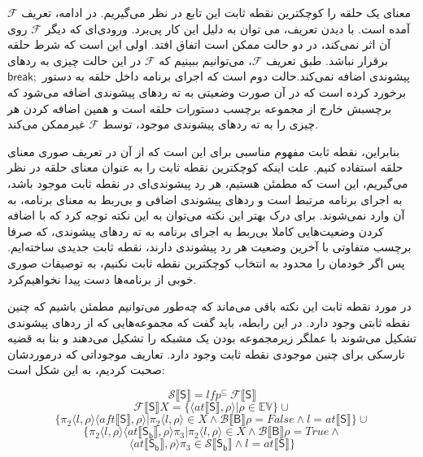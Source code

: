 \begin{defn}
	 معنای یک حلقه را کوچکترین نقطه ثابت این تابع در نظر می‌گیریم. در ادامه، تعریف $\mathcal{F} $ آمده است. با دیدن تعریف، می توان به دلیل این کار پی‌برد. ورودی‌ای که دیگر $\mathcal{F} $ روی آن اثر نمی‌کند، در دو حالت ممکن است اتفاق افتد. اولی این است که شرط حلقه برقرار نباشد. طبق تعریف $\mathcal{F} $،  می‌توانیم ببینیم که $\mathcal{F} $  در این حالت چیزی به ردهای پیشوندی اضافه نمی‌کند.حالت دوم است که اجرای برنامه داخل حلقه به دستور $\mathsf{break;}$ برخورد کرده است که در آن صورت وضعیتی به ته ردهای پیشوندی اضافه می‌شود که برچسبش خارج از مجموعه برچسب دستورات حلقه است و همین اضافه کردن هر چیزی را به ته ردهای پیشوندی موجود، توسط $\mathcal{F} $  غیرممکن می‌کند. 
	
	 بنابراین، نقطه ثابت مفهوم مناسبی برای این است که از آن در تعریف صوری معنای حلقه استفاده کنیم. علت اینکه کوچکترین نقطه ثابت را به عنوان معنای حلقه در نظر می‌گیریم، این است که مطمئن هستیم، هر رد پیشوندی‌ای در نقطه ثابت موجود باشد، به اجرای برنامه مرتبط است و ردهای پیشوندی اضافی و بی‌ربط به معنای برنامه، به آن وارد نمی‌شوند. برای درک بهتر این نکته می‌توان به این نکته توجه کرد که با اضافه کردن وضعیت‌هایی کاملا بی‌ربط به اجرای برنامه به ته رد‌های پیشوندی، که صرفا برچسب متفاوتی با آخرین وضعیت هر رد پیشوندی دارند، نقطه ثابت جدیدی ساخته‌ایم. پس اگر خودمان را محدود به انتخاب کوچکترین نقطه ثابت نکنیم، به توصیفات صوری خوبی از برنامه‌ها دست پیدا نخواهیم‌کرد. 
	 
	 در مورد نقطه ثابت این نکته باقی می‌ماند که چه‌طور می‌توانیم مطمئن باشیم که چنین نقطه ثابتی وجود دارد. در این رابطه، باید گفت که مجموعه‌هایی که از ردهای پیشوندی تشکیل می‌شوند با عملگر زیرمجموعه بودن یک مشبکه را تشکیل می‌دهند و بنا به قضیه تارسکی\cite{tarski} برای چنین موجودی نقطه ثابت وجود دارد.
	تعاریف موجوداتی که درموردشان صحبت کردیم، به این شکل است:
	
	$$\mathcal{S} \llbracket\mathsf{S}\rrbracket = lfp^{\subseteq}\: \mathcal{F\llbracket\mathsf{S}\rrbracket}      $$ $$\mathcal{F} \llbracket\mathsf{S}\rrbracket X= \{ \langle at\llbracket\mathsf{S}\rrbracket , \rho \rangle | \rho \in \mathbb{EV}       \} \cup $$
	$$  \{ \pi_2 \langle l ,\rho \rangle \langle aft\llbracket\mathsf{S}\rrbracket,\rho \rangle |  \pi_2 \langle l ,\rho \rangle \in X \wedge \mathcal{B}\llbracket\mathsf{B}\rrbracket\rho=False \wedge l= at\llbracket\mathsf{S}\rrbracket   \} \cup      $$
	$$  \{ \pi_2 \langle l ,\rho \rangle \langle at\llbracket\mathsf{S_b}\rrbracket,\rho \rangle \pi_3 |  \pi_2 \langle l ,\rho \rangle \in X \wedge \mathcal{B}\llbracket\mathsf{B}\rrbracket\rho=True \wedge$$$$  \langle at\llbracket\mathsf{S_b}\rrbracket,\rho \rangle \pi_3 \in  \mathcal{S} \llbracket\mathsf{S_b}\rrbracket   \wedge   l= at\llbracket\mathsf{S}\rrbracket  \}  $$\\
	

\end{defn}
